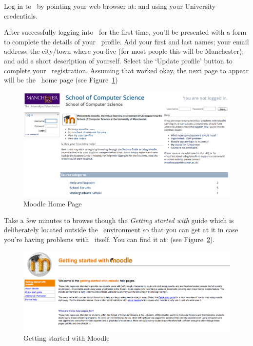 Log in to \moodle\ by pointing your web browser at:  and using your University credentials. 

After successfully logging into \moodle\ for the first time, you'll be presented with a form to complete the details of your \moodle\ profile. Add your first and last names; your email address; the city/town where you live (for most people this will be Manchester); and add a short description of yourself. Select the `Update profile' button to complete your \moodle\ registration. Assuming that worked okay, the next page to appear will be the \moodle\ home page (see  Figure~\ref{figure:moodle-home})

\begin{figure}
\centerline{\includegraphics[width=15cm]{images/moodle-home}}
\caption{Moodle Home Page}\label{figure:moodle-home}
\end{figure}

Take a few minutes to browse though the \emph{Getting started with \Moodle} guide which is deliberately located outside the \moodle\ environment so that you can get at it in case you're having problems with \moodle\ itself. You can find it at:  (see Figure~\ref{figure:moodle-start}).

\begin{figure}
\centerline{\includegraphics[width=15cm]{images/start-moodle-page}}
\caption{Getting started with Moodle}\label{figure:moodle-start}
\end{figure}

